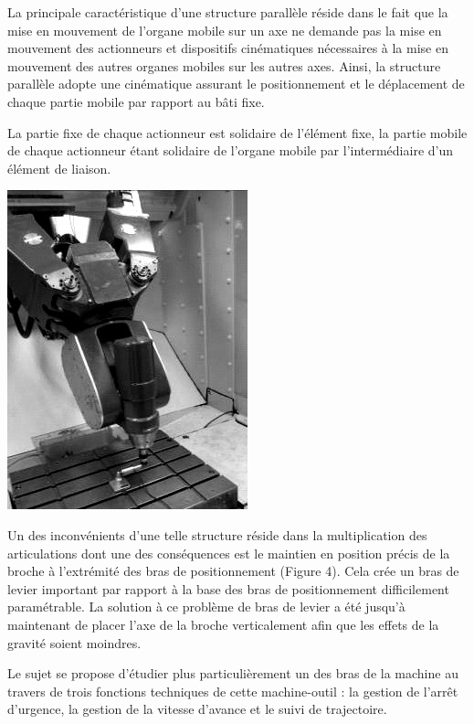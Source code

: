 La principale caractéristique d'une structure parallèle réside dans le fait que la mise en mouvement de l'organe mobile sur un axe ne demande pas la mise en mouvement des actionneurs et dispositifs cinématiques nécessaires à la mise en mouvement des autres organes mobiles sur les autres axes. Ainsi, la structure parallèle adopte une cinématique assurant le positionnement et le déplacement de chaque partie mobile par rapport au bâti fixe.

La partie fixe de chaque actionneur est solidaire de l'élément fixe, la partie mobile de chaque actionneur étant solidaire de l'organe mobile par l'intermédiaire d'un élément de liaison.

\begin{center}
 \includegraphics[width=0.3\linewidth]{img/img05}
\end{center}

Un des inconvénients d'une telle structure réside dans la multiplication des articulations dont une des conséquences est le maintien en position précis de la broche à l'extrémité des bras de positionnement (Figure 4). Cela crée un bras de levier important par rapport à la base des bras de positionnement difficilement paramétrable. La solution à ce problème de bras de levier a été jusqu'à maintenant de placer l'axe de la broche verticalement afin que les effets de la gravité soient moindres.


Le sujet se propose d'étudier plus particulièrement un des bras de la machine au travers de trois fonctions techniques de cette machine-outil : la gestion de l'arrêt d'urgence, la gestion de la vitesse d'avance et le suivi de trajectoire.


